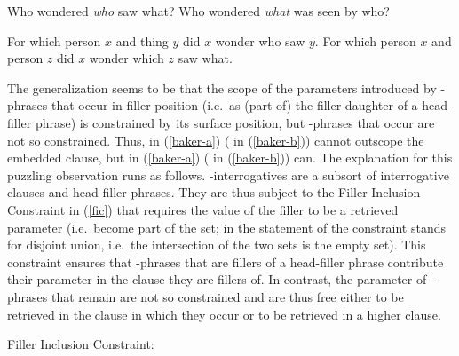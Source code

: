 \documentclass[output=paper,biblatex,babelshorthands,newtxmath,draftmode,colorlinks,citecolor=brown]{langscibook}
\begin{document}
\begin{exe}
\ex\label{baker-exs}
\begin{xlist}
\ex\label{baker-a} Who wondered \emph{who} saw what?
\ex\label{baker-b} Who wondered \emph{what} was seen by who?
\end{xlist}
\ex\label{baker-sem}
\begin{xlist}
\ex\label{baker-sem-a}For which person $x$ and thing $y$ did $x$ wonder who saw $y$.
\ex\label{baker-sem-b}For which person $x$ and person $z$ did $x$ wonder which $z$ saw what.
\end{xlist}
\end{exe}

The generalization seems to be that the scope of the parameters  introduced by -phrases that occur in filler position (i.e.\ as (part of) the filler daughter of a head-filler phrase) is constrained by its surface position, but -phrases that occur  are not so constrained. Thus,  in (\ref{baker-a})  ( in (\ref{baker-b})) cannot outscope the embedded clause, but  in (\ref{baker-a}) ( in (\ref{baker-b})) can.
The explanation for this puzzling observation runs as follows. -interrogatives are a subsort of interrogative clauses and head-filler phrases. They are thus subject to the Filler-Inclusion Constraint in (\ref{fic}) that requires the  value of the filler to be a retrieved parameter (i.e.\ become part of the  set; \isi{$\uplus$} in the statement of the constraint stands for disjoint union, i.e.\ the intersection of the two sets is the empty set). 
This constraint ensures that -phrases that are fillers of a head-filler phrase contribute their parameter in the clause they are fillers of. In contrast, the parameter of -phrases that remain  are not so constrained and are thus free either to be retrieved in the clause in which they occur or to be retrieved in a higher clause. 

\begin{exe}
\ex\label{fic}Filler Inclusion Constraint:\\
\end{exe}
\end{document}
